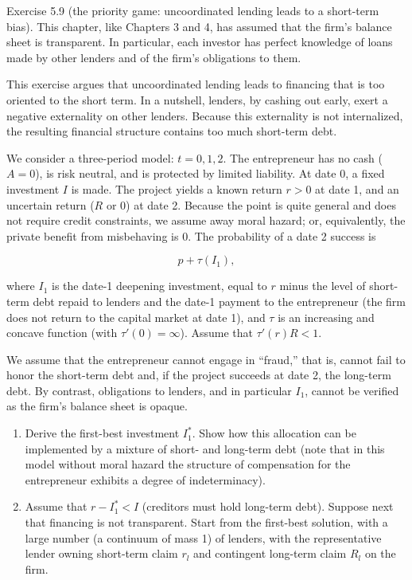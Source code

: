 \documentclass[11pt,a4paper]{article}
\begin{document}
Exercise 5.9 (the priority game: uncoordinated lending leads to a short-term bias). This chapter,
like Chapters 3 and 4, has assumed that the firm's balance sheet is transparent. In particular, each
investor has perfect knowledge of loans made by other lenders and of the firm's obligations to them.

This exercise argues that uncoordinated lending leads to financing that is too oriented to the short
term. In a nutshell, lenders, by cashing out early, exert a negative externality on other lenders.
Because this externality is not internalized, the resulting financial structure contains too much
short-term debt.

We consider a three-period model: \(t = 0, 1, 2\). The entrepreneur has no cash (\(A = 0\)), is risk
neutral, and is protected by limited liability. At date 0, a fixed investment \(I\) is made. The
project yields a known return \(r > 0\) at date 1, and an uncertain return (\(R\) or 0) at date 2.
Because the point is quite general and does not require credit constraints, we assume away moral
hazard; or, equivalently, the private benefit from misbehaving is 0. The probability of a date 2
success is

\[p + \tau(I_1),\]

where \(I_1\) is the date-1 deepening investment, equal to \(r\) minus the level of short-term debt
repaid to lenders and the date-1 payment to the entrepreneur (the firm does not return to the
capital market at date 1), and \(\tau\) is an increasing and concave function (with
\(\tau'(0) = \infty\)). Assume that \(\tau'(r)R < 1\).

We assume that the entrepreneur cannot engage in ``fraud,'' that is, cannot fail to honor the
short-term debt and, if the project succeeds at date 2, the long-term debt. By contrast, obligations
to lenders, and in particular \(I_1\), cannot be verified as the firm's balance sheet is opaque.

\begin{enumerate}
\def\labelenumi{(\roman{enumi})}
\item
  Derive the first-best investment \(I_1^*\). Show how this allocation can be implemented by a
  mixture of short- and long-term debt (note that in this model without moral hazard the structure
  of compensation for the entrepreneur exhibits a degree of indeterminacy).
\item
  Assume that \(r - I_1^* < I\) (creditors must hold long-term debt). Suppose next that financing is
  not transparent. Start from the first-best solution, with a large number (a continuum of mass 1)
  of lenders, with the representative lender owning short-term claim \(r_l\) and contingent
  long-term claim \(R_l\) on the firm.
\end{enumerate}
\end{document}
